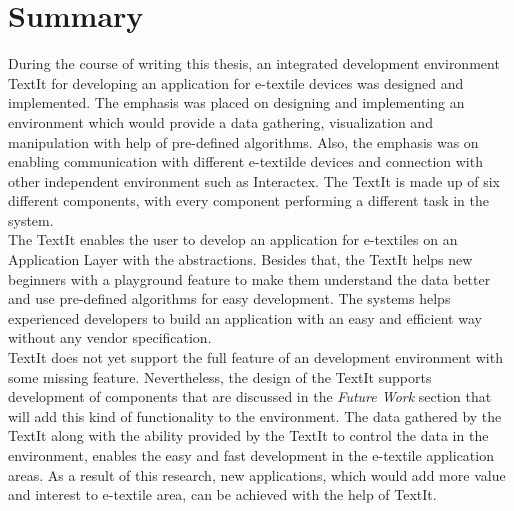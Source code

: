 \section{Summary}

During the course of writing this thesis, an integrated development environment TextIt for developing an application for e-textile devices was designed and implemented. The emphasis was placed on designing and implementing an environment which would provide a data gathering, visualization and manipulation with help of pre-defined algorithms. Also, the emphasis was on enabling communication with different e-textilde devices and connection with other independent environment such as Interactex. The TextIt is made up of six different components, with every component performing a different task in the system.  \\ 

The TextIt enables the user to develop an application for e-textiles on an Application Layer with the abstractions. Besides that, the TextIt helps new beginners with a playground feature to make them understand the data better and use pre-defined algorithms for easy development. The systems helps experienced developers to build an application with an easy and efficient way without any vendor specification. \\

TextIt does not yet support the full feature of an development environment with some missing feature. Nevertheless, the design of the TextIt supports development of components that are discussed in the \textit{Future Work} section that will add this kind of functionality to the environment. The data gathered by the TextIt along with the ability provided by the TextIt to control the data in the environment, enables the easy and fast development in the e-textile application areas. As a result of this research, new applications, which would add more value and interest to e-textile area, can be achieved with the help of TextIt.